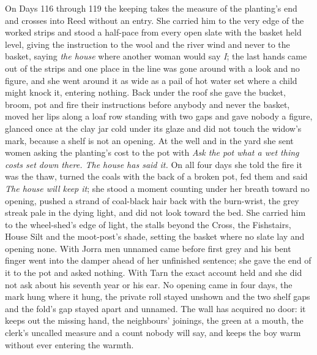 \documentclass{design/chronicle}
\begin{document}
{On Days 116 through 119 the keeping takes the measure of the planting’s end and crosses into Reed without an entry. She carried him to the very edge of the worked strips and stood a half-pace from every open slate with the basket held level, giving the instruction to the wool and the river wind and never to the basket, saying \emph{the house} where another woman would say \emph{I}; the last hands came out of the strips and one place in the line was gone around with a look and no figure, and she went around it as wide as a pail of hot water set where a child might knock it, entering nothing. Back under the roof she gave the bucket, broom, pot and fire their instructions before anybody and never the basket, moved her lips along a loaf row standing with two gaps and gave nobody a figure, glanced once at the clay jar cold under its glaze and did not touch the widow’s mark, because a shelf is not an opening. At the well and in the yard she sent women asking the planting’s cost to the pot with \emph{Ask the pot what a wet thing costs set down there. The house has said it.} On all four days she told the fire it was the thaw, turned the coals with the back of a broken pot, fed them and said \emph{The house will keep it}; she stood a moment counting under her breath toward no opening, pushed a strand of coal-black hair back with the burn-wrist, the grey streak pale in the dying light, and did not look toward the bed. She carried him to the wheel-shed’s edge of light, the stalls beyond the Cross, the Fishstairs, House Silt and the moot-post’s shade, setting the basket where no slate lay and opening none. With Jorra men unnamed came before first grey and his bent finger went into the damper ahead of her unfinished sentence; she gave the end of it to the pot and asked nothing. With Tarn the exact account held and she did not ask about his seventh year or his ear. No opening came in four days, the mark hung where it hung, the private roll stayed unshown and the two shelf gaps and the fold’s gap stayed apart and unnamed. The wall has acquired no door: it keeps out the missing hand, the neighbours’ joinings, the green at a mouth, the clerk’s uncalled measure and a count nobody will say, and keeps the boy warm without ever entering the warmth.

}
\end{document}

